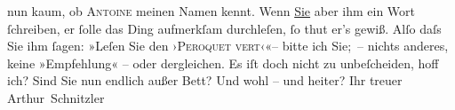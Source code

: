\begin{ledgroupsized}[t]{13cm}
                    nun kaum, ob \textsc{Antoine} meinen Namen kennt. Wenn \uline{Sie} aber
                    ihm ein {\pb}Wort ſchreiben, er ſolle das
                    Ding aufmerkſam durchleſen, ſo thut er’s gewiß. Alſo daſs Sie ihm ſagen: »Leſen
                    Sie den ›\textsc{Peroquet vert}‹«– bitte ich Sie; – nichts anderes, keine »Empfehlung« – oder
                    dergleichen.\pend
           \pstart
           Es iſt doch nicht zu unbeſcheiden, hoff ich?\pend
           \pstart
           Sind Sie nun endlich außer Bett? Und wohl – und heiter? Ihr treuer \spacefill\mbox{Arthur
                        Schnitzler}\pend
                     \endnumbering{}\end{ledgroupsized}  \newcommand{\dateiname}{L00923}\newcommand{\titel}{Arthur Schnitzler an Georg Brandes, 8. 6. 1899}\newcommand{\editorInnen}{Martin Anton Müller und Gerd-Hermann Susen}
            \footnotesize
\begin{ledgroupsized}[t]{11.5cm}
\end{ledgroupsized}
         
      